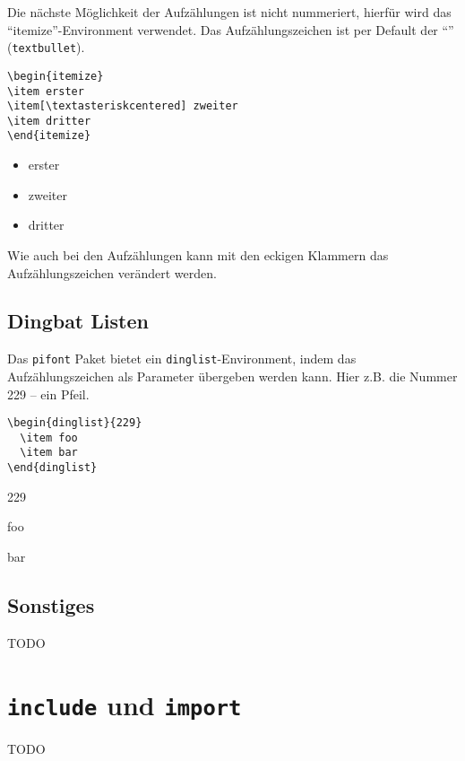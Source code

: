 Die nächste Möglichkeit der Aufzählungen ist nicht nummeriert, hierfür wird das "`itemize"'-Environment verwendet. Das Aufzählungszeichen ist per Default der "`\textbullet"' (\texttt{textbullet}).
\begin{verbatim}
\begin{itemize}
\item erster
\item[\textasteriskcentered] zweiter
\item dritter
\end{itemize}
\end{verbatim}

\begin{itemize}
\item erster
\item[\textasteriskcentered] zweiter
\item dritter
\end{itemize}
Wie auch bei den Aufzählungen kann mit den eckigen Klammern das Aufzählungszeichen verändert werden. 

\subsection{Dingbat Listen}

Das \texttt{pifont} Paket bietet ein \texttt{dinglist}-Environment, indem das Aufzählungszeichen als Parameter übergeben werden kann. Hier z.B. die Nummer 229 -- ein Pfeil.

\begin{verbatim}
\begin{dinglist}{229}
  \item foo
  \item bar
\end{dinglist}
\end{verbatim}

\begin{dinglist}{229}
  \item foo
  \item bar
\end{dinglist}

\subsection{Sonstiges}

TODO

\section{\texttt{include} und \texttt{import}}\label{sect:import}

TODO